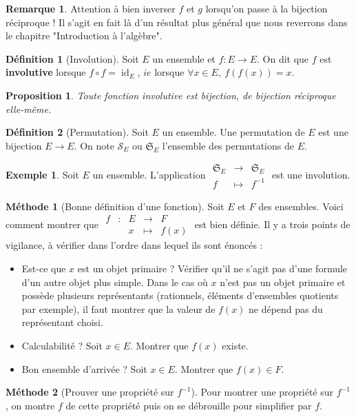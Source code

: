 \documentclass[french]{book}
\newcommand{\inv}{^{-1}}
\theoremstyle{plain}
\newtheorem{prop}{Proposition}[chapter]
\theoremstyle{definition}
\newtheorem{dfn}{Définition}[chapter]
\newtheorem{exa}{Exemple}[chapter]
\newtheorem{rmq}{Remarque}[chapter]
\newtheorem{met}{Méthode}[chapter]
\theoremstyle{remark}
\DeclareMathOperator{\id}{id}
\begin{document}
\begin{rmq}
	Attention à bien inverser $f$ et $g$ lorsqu'on passe à la bijection réciproque ! Il s'agit en fait là d'un résultat plus général que nous reverrons dans le chapitre "Introduction à l'algèbre".
\end{rmq}
\begin{dfn}[Involution]
	Soit $E$ un ensemble et $f:E\rightarrow E$. On dit que $f$ est \textbf{involutive} lorsque $f\circ f=\id_E$, $ie$ lorsque $\forall x\in E,\ f(f(x))=x$.
\end{dfn}
\begin{prop}
	Toute fonction involutive est bijection, de bijection réciproque elle-même.
\end{prop}
\begin{dfn}[Permutation]
	Soit $E$ un ensemble. Une permutation de $E$ est une bijection $E\rightarrow E$. On note $\mathcal{S}_E$ ou $\mathfrak{S}_E$ l'ensemble des permutations de $E$.
\end{dfn}
\begin{exa}
	Soit $E$ un ensemble. L'application $\begin{array}{ccc}\mathfrak{S}_E&\rightarrow&\mathfrak{S}_E\\ f&\mapsto&f\inv\end{array}$ est une involution.
\end{exa}
\begin{met}[Bonne définition d'une fonction]
	Soit $E$ et $F$ des ensembles. Voici comment montrer que $\begin{array}{ccccc}f&:&E&\rightarrow&F\\&&x&\mapsto&f(x)\end{array}$ est bien définie. Il y a trois points de vigilance, à vérifier dans l'ordre dans lequel ils sont énoncés :
	\begin{itemize}
		\item Est-ce que $x$ est un objet primaire ? Vérifier qu'il ne s'agit pas d'une formule d'un autre objet plus simple. Dans le cas où $x$ n'est pas un objet primaire et possède plusieurs représentants (rationnels, éléments d'ensembles quotients par exemple), il faut montrer que la valeur de $f(x)$ ne dépend pas du représentant choisi.
		\item Calculabilité ? Soit $x\in E$. Montrer que $f(x)$ existe.
		\item Bon ensemble d'arrivée ? Soit $x\in E$. Montrer que $f(x)\in F$.
	\end{itemize}
\end{met}
\begin{met}[Prouver une propriété sur $f\inv$]
	Pour montrer une propriété sur $f\inv$, on montre $f$ de cette propriété puis on se débrouille pour simplifier par $f$.
\end{met}
\end{document}
